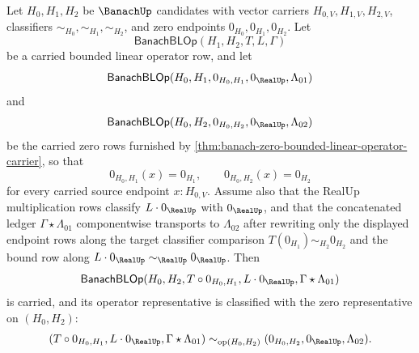 \begin{theorem}
\label{thm:banach-bounded-linear-operator-left-zero-annihilation}
Let $H_0,H_1,H_2$ be $\BanachUp$ candidates with vector carriers $H_{0,V},H_{1,V},H_{2,V}$, classifiers $\sim_{H_0},\sim_{H_1},\sim_{H_2}$, and zero endpoints $0_{H_0},0_{H_1},0_{H_2}$. Let
$$
\mathsf{BanachBLOp}(H_1,H_2,T,L,\Gamma)
$$
be a carried bounded linear operator row, and let
$$
\mathsf{BanachBLOp}(H_0,H_1,0_{H_0,H_1},0_{\RealUp},\Lambda_{01})
$$
and
$$
\mathsf{BanachBLOp}(H_0,H_2,0_{H_0,H_2},0_{\RealUp},\Lambda_{02})
$$
be the carried zero rows furnished by \autoref{thm:banach-zero-bounded-linear-operator-carrier}, so that
$$
0_{H_0,H_1}(x)=0_{H_1},
\qquad
0_{H_0,H_2}(x)=0_{H_2}
$$
for every carried source endpoint $x:H_{0,V}$. Assume also that the RealUp multiplication rows classify $L\cdot 0_{\RealUp}$ with $0_{\RealUp}$, and that the concatenated ledger $\Gamma\star\Lambda_{01}$ componentwise transports to $\Lambda_{02}$ after rewriting only the displayed endpoint rows along the target classifier comparison $T(0_{H_1})\sim_{H_2}0_{H_2}$ and the bound row along $L\cdot 0_{\RealUp}\sim_{\RealUp}0_{\RealUp}$. Then
$$
\mathsf{BanachBLOp}(H_0,H_2,T\circ 0_{H_0,H_1},L\cdot 0_{\RealUp},\Gamma\star\Lambda_{01})
$$
is carried, and its operator representative is classified with the zero representative on $(H_0,H_2)$:
$$
(T\circ 0_{H_0,H_1},L\cdot 0_{\RealUp},\Gamma\star\Lambda_{01})
\sim_{\mathrm{op}(H_0,H_2)}
(0_{H_0,H_2},0_{\RealUp},\Lambda_{02}).
$$
\end{theorem}
